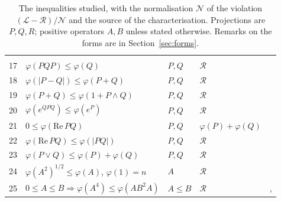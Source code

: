 \documentclass[11pt]{article}
\newcommand{\cL}{\mathcal{L}}
\newcommand{\cR}{\mathcal{R}}
\newcommand{\cN}{\mathcal{N}}
\renewcommand{\Re}{\mathrm{Re}\,}
\theoremstyle{plain}
\theoremstyle{definition}
\theoremstyle{remark}
\begin{document}
\begin{table}[h]
\begin{tabular}{rllll}
\cite[Lemma~1]{bikchentaev2011pb}\\
17 & $\varphi(PQP)\le\varphi(Q)$ & $P,Q$ & $\cR$ & \cite[Thm.~3.4(iv)]{bikchentaev2010smj}\\
18 & $\varphi(|P-Q|)\le\varphi(P+Q)$ & $P,Q$ & $\cR$ & \cite[Thm.~3.4(v)]{bikchentaev2010smj}\\
19 & $\varphi(P+Q)\le\varphi(1+P\wedge Q)$ & $P,Q$ & $\cR$ & \cite[Thm.~3.4(iii)]{bikchentaev2010smj}\\
20 & $\varphi(e^{QPQ})\le\varphi(e^P)$ & $P,Q$ & $\cR$ & \cite[Thm.~2(v)]{bikchentaev2011mn}\\
21 & $0\le\varphi(\Re PQ)$ & $P,Q$ & $\varphi(P)+\varphi(Q)$ & \cite[Thm.~2(vi)]{bikchentaev2011mn}\\
22 & $\varphi(\Re PQ)\le\varphi(|PQ|)$ & $P,Q$ & $\cR$ & \cite[Thm.~2(vii)]{bikchentaev2011mn}\\
23 & $\varphi(P\vee Q)\le\varphi(P)+\varphi(Q)$ & $P,Q$ & $\cR$ & \cite[Thm.~4]{petz1988}\\
24 & $\varphi(A^2)^{1/2}\le\varphi(A)$, $\varphi(1)=n$ & $A$ & $\cR$ & \cite[Thm.~3(vii)]{bikchentaev2020det}\\
25 & $0\le A\le B\Rightarrow\varphi(A^4)\le\varphi(AB^2A)$ & $A\le B$ & $\cR$ & \cite[Thms.~4, 5, $r=1$]{hoa2010}, \cite{hoa2007}\\
\bottomrule
\end{tabular}
\caption{The inequalities studied, with the normalisation $\cN$ of the violation $(\cL-\cR)/\cN$ and the source of the
characterisation. Projections are $P,Q,R$; positive operators $A,B$ unless stated otherwise. Remarks on the forms are
in Section~\ref{sec:forms}.}
\label{tab:items}
\end{table}
\end{document}
